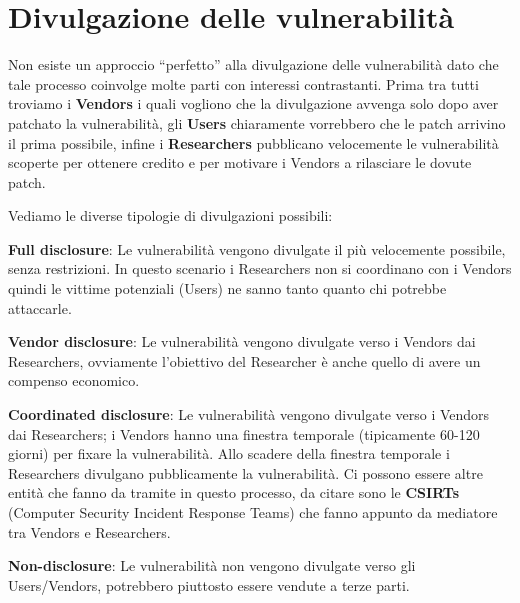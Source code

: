 \section{Divulgazione delle vulnerabilità}

Non esiste un approccio “perfetto” alla divulgazione delle vulnerabilità dato 
che tale processo coinvolge molte parti con interessi contrastanti. Prima tra 
tutti troviamo i \textbf{Vendors} i quali vogliono che la divulgazione avvenga solo dopo
aver patchato la vulnerabilità, gli \textbf{Users} chiaramente vorrebbero che le patch 
arrivino il prima possibile, infine i \textbf{Researchers} pubblicano velocemente
le vulnerabilità scoperte per ottenere credito e per motivare i Vendors a rilasciare
le dovute patch.

Vediamo le diverse tipologie di divulgazioni possibili:

\textbf{Full disclosure}: Le vulnerabilità vengono divulgate il più velocemente
possibile, senza restrizioni. In questo scenario i Researchers non si coordinano
con i Vendors quindi le vittime potenziali (Users) ne sanno tanto quanto chi potrebbe attaccarle.

\textbf{Vendor disclosure}: Le vulnerabilità vengono divulgate verso i Vendors dai
Researchers, ovviamente l'obiettivo del Researcher è anche quello di avere un compenso
economico.

\textbf{Coordinated disclosure}: Le vulnerabilità vengono divulgate verso i Vendors
dai Researchers; i Vendors hanno una finestra temporale (tipicamente 60-120 giorni)
per fixare la vulnerabilità. Allo scadere della finestra temporale i Researchers
divulgano pubblicamente la vulnerabilità.
Ci possono essere altre entità che fanno da tramite in questo processo, da citare
sono le \textbf{CSIRTs} (Computer Security Incident Response Teams) che fanno appunto da mediatore tra Vendors e Researchers.

\textbf{Non-disclosure}: Le vulnerabilità non vengono divulgate verso gli Users/Vendors,
potrebbero piuttosto essere vendute a terze parti.